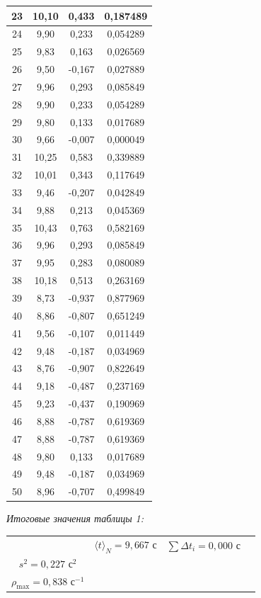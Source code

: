 \documentclass[a4paper,14pt]{extarticle}
\begin{document}
\begin{longtable}{|c|c|c|c|}
		23 & 10,10 & 0,433  & 0,187489 \\ \hline
		24 & 9,90  & 0,233  & 0,054289 \\ \hline
		25 & 9,83  & 0,163  & 0,026569 \\ \hline
		26 & 9,50  & -0,167 & 0,027889 \\ \hline
		27 & 9,96  & 0,293  & 0,085849 \\ \hline
		28 & 9,90  & 0,233  & 0,054289 \\ \hline
		29 & 9,80  & 0,133  & 0,017689 \\ \hline
		30 & 9,66  & -0,007 & 0,000049 \\ \hline
		31 & 10,25 & 0,583  & 0,339889 \\ \hline
		32 & 10,01 & 0,343  & 0,117649 \\ \hline
		33 & 9,46  & -0,207 & 0,042849 \\ \hline
		34 & 9,88  & 0,213  & 0,045369 \\ \hline
		35 & 10,43 & 0,763  & 0,582169 \\ \hline
		36 & 9,96  & 0,293  & 0,085849 \\ \hline
		37 & 9,95  & 0,283  & 0,080089 \\ \hline
		38 & 10,18 & 0,513  & 0,263169 \\ \hline
		39 & 8,73  & -0,937 & 0,877969 \\ \hline
		40 & 8,86  & -0,807 & 0,651249 \\ \hline
		41 & 9,56  & -0,107 & 0,011449 \\ \hline
		42 & 9,48  & -0,187 & 0,034969 \\ \hline
		43 & 8,76  & -0,907 & 0,822649 \\ \hline
		44 & 9,18  & -0,487 & 0,237169 \\ \hline
		45 & 9,23  & -0,437 & 0,190969 \\ \hline
		46 & 8,88  & -0,787 & 0,619369 \\ \hline
		47 & 8,88  & -0,787 & 0,619369 \\ \hline
		48 & 9,80  & 0,133  & 0,017689 \\ \hline
		49 & 9,48  & -0,187 & 0,034969 \\ \hline
		50 & 8,96  & -0,707 & 0,499849 \\ \hline
	\end{longtable}
	\endgroup

	\noindent\textit{Итоговые значения таблицы 1:}
	\begin{center}
	\small
	\renewcommand{\arraystretch}{1.25}
	\begin{tabular}{|c|c|c|c|}
		\hline
		& $\langle t \rangle_N = 9{,}667$ с & $\sum \Delta t_i = 0{,}000$ с & \makecell{$\sigma_N = 0{,}476$ с \\ $s^2 = 0{,}227$ с$^2$ \\ $\rho_{\max} = 0{,}838$ с$^{-1}$} \\ \hline
	\end{tabular}
	\end{center}
\end{document}
